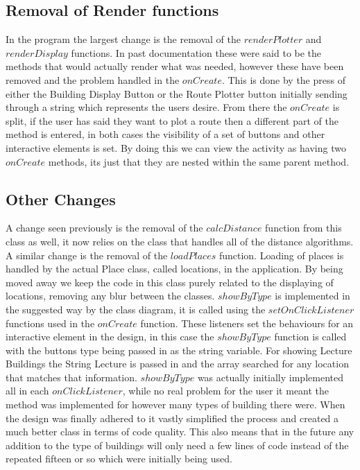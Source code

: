 \subsection{Removal of Render functions}
In the program the largest change is the removal of the $renderPlotter$ and $renderDisplay$ functions. In past documentation these were said to be the methods that would actually render what was needed, however these have been removed and the problem handled in the $onCreate$. This is done by the press of either the Building Display Button or the Route Plotter button initially sending through a string which represents the users desire. From there the $onCreate$ is split, if the user has said they want to plot a route then a different part of the method is entered, in both cases the visibility of a set of buttons and other interactive elements is set. By doing this we can view the activity as having two $onCreate$ methods, its just that they are nested within the same parent method. 
\subsection{Other Changes}
A change seen previously is the removal of the $calcDistance$ function from this class as well, it now relies on the class that handles all of the distance algorithms. A similar change is the removal of the $loadPlaces$ function. Loading of places is handled by the actual Place class, called locations, in the application. By being moved away we keep the code in this class purely related to the displaying of locations, removing any blur between the classes. $showByType$ is implemented in the suggested way by the class diagram, it is called using the $setOnClickListener$ functions used in the $onCreate$ function. These listeners set the behaviours for an interactive element in the design, in this case the $showByType$ function is called with the buttons type being passed in as the string variable. For showing Lecture Buildings the String Lecture is passed in and the array searched for any location that matches that information. $showByType$ was actually initially implemented all in each $onClickListener$, while no real problem for the user it meant the method was implemented for however many types of building there were. When the design was finally adhered to it vastly simplified the process and created a much better class in terms of code quality. This also means that in the future any addition to the type of buildings will only need a few lines of code instead of the repeated fifteen or so which were initially being used. 

